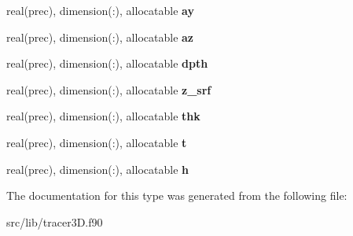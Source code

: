 \begin{DoxyCompactItemize}
real(prec), dimension(\+:), allocatable {\bfseries ay}
\item 
\mbox{\label{structtracer3d_1_1tracer__state__class_afbe58ebc71d95db831507b307d28a5b6}} 
real(prec), dimension(\+:), allocatable {\bfseries az}
\item 
\mbox{\label{structtracer3d_1_1tracer__state__class_a1b967658f4f0a5c0d727b02be993e241}} 
real(prec), dimension(\+:), allocatable {\bfseries dpth}
\item 
\mbox{\label{structtracer3d_1_1tracer__state__class_ae5dd01566aa84508017ea302356a263b}} 
real(prec), dimension(\+:), allocatable {\bfseries z\+\_\+srf}
\item 
\mbox{\label{structtracer3d_1_1tracer__state__class_aba3e3096026a8e8f090c2580944fd681}} 
real(prec), dimension(\+:), allocatable {\bfseries thk}
\item 
\mbox{\label{structtracer3d_1_1tracer__state__class_ae64e9e0c66c93ee01bf9fa9049c9a381}} 
real(prec), dimension(\+:), allocatable {\bfseries t}
\item 
\mbox{\label{structtracer3d_1_1tracer__state__class_a8b97bd7e1174f0b475186c6784b0d5ec}} 
real(prec), dimension(\+:), allocatable {\bfseries h}
\end{DoxyCompactItemize}


The documentation for this type was generated from the following file\+:\begin{DoxyCompactItemize}
\item 
src/lib/tracer3\+D.\+f90\end{DoxyCompactItemize}
